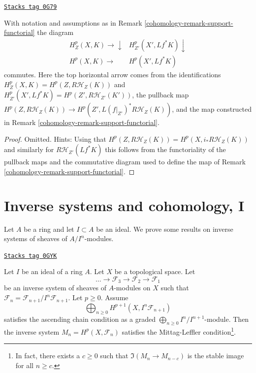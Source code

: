 \begin{lemma}
\label{cohomology-lemma-support-functorial}
\href{https://stacks.math.columbia.edu/tag/0G79}{\texttt{Stacks tag 0G79}}

With notation and assumptions as in Remark \ref{cohomology-remark-support-functorial}
the diagram
$$
\begin{array}{cc}H^p_Z(X, K) \longrightarrow\downarrow & H^p_{Z'}(X', Lf^*K) \downarrow \\ H^p(X, K) \longrightarrow & H^p(X', Lf^*K)\end{array}
$$
commutes. Here the top horizontal arrow comes from the identifications
$H^p_Z(X, K) = H^p(Z, R\mathcal{H}_Z(K))$ and
$H^p_{Z'}(X', Lf^*K) = H^p(Z', R\mathcal{H}_{Z'}(K'))$,
the pullback map
$H^p(Z, R\mathcal{H}_Z(K)) \to H^p(Z', L(f|_{Z'})^*R\mathcal{H}_Z(K))$,
and the map constructed in Remark \ref{cohomology-remark-support-functorial}.
\end{lemma}

\begin{proof}

Omitted. Hints:
Using that $H^p(Z, R\mathcal{H}_Z(K)) = H^p(X, i_*R\mathcal{H}_Z(K))$
and similarly for $R\mathcal{H}_{Z'}(Lf^*K)$ this follows from
the functoriality of the pullback maps and the commutative diagram
used to define the map of Remark \ref{cohomology-remark-support-functorial}.
\end{proof}

\section{Inverse systems and cohomology, I}
\label{cohomology-section-inverse-systems}
Let $A$ be a ring and let $I \subset A$ be an ideal.
We prove some results on inverse systems of sheaves of $A/I^n$-modules.

\begin{lemma}[ML general]
\label{cohomology-lemma-ML-general}
\href{https://stacks.math.columbia.edu/tag/0GYK}{\texttt{Stacks tag 0GYK}}

Let $I$ be an ideal of a ring $A$. Let $X$ be a topological space.
Let
$$
\ldots \to \mathcal{F}_3 \to \mathcal{F}_2 \to \mathcal{F}_1
$$
be an inverse system of sheaves of $A$-modules on $X$
such that $\mathcal{F}_n = \mathcal{F}_{n + 1}/I^n\mathcal{F}_{n + 1}$.
Let $p \geq 0$. Assume
$$
\bigoplus\nolimits_{n \geq 0} H^{p + 1}(X, I^n\mathcal{F}_{n + 1})
$$
satisfies the ascending chain condition as a graded
$\bigoplus_{n \geq 0} I^n/I^{n + 1}$-module.
Then the inverse system $M_n = H^p(X, \mathcal{F}_n)$ satisfies the
Mittag-Leffler condition\footnote{In fact, there exists
a $c \geq 0$ such that $\Im(M_n \to M_{n - c})$ is the stable image
for all $n \geq c$.}.
\end{lemma}

